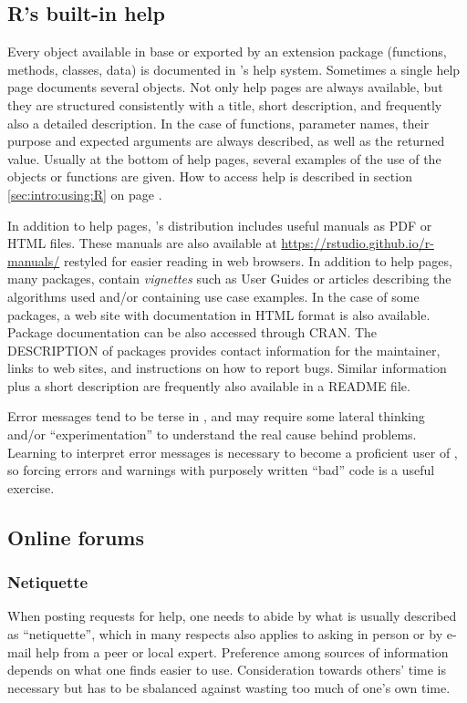\documentclass[krantz2]{krantz}\usepackage{knitr}
\begin{document}
\subsection{R's built-in help}

Every object available in base \Rlang or exported by an \Rlang extension package (functions, methods, classes, data) is documented in \Rlang's help system. Sometimes a single help page documents several \Rlang objects. Not only help pages are always available, but they are structured consistently with a title, short description, and frequently also a detailed description. In the case of functions, parameter names, their purpose and expected arguments are always described, as well as the returned value. Usually at the bottom of help pages, several examples of the use of the objects or functions are given. How to access \Rpgrm help is described in section \ref{sec:intro:using:R} on page \pageref{sec:intro:using:R}.

In addition to help pages, \Rpgrm's distribution includes useful manuals as PDF or HTML files. These manuals are also available at \url{https://rstudio.github.io/r-manuals/} restyled for easier reading in web browsers. In addition to help pages, many packages, contain \emph{vignettes} such as User Guides or articles describing the algorithms used and/or containing use case examples. In the case of some packages, a web site with documentation in HTML format is also available. Package documentation can be also accessed through CRAN. The DESCRIPTION of packages provides contact information for the maintainer, links to web sites, and instructions on how to report bugs. Similar information plus a short description are frequently also available in a README file.

Error messages tend to be terse in \Rpgrm, and may require some lateral thinking and/or ``experimentation'' to understand the real cause behind problems. Learning to interpret error messages is necessary to become a proficient user of \Rpgrm, so forcing errors and warnings with purposely written ``bad'' code is a useful exercise.

\subsection{Online forums}\label{sec:intro:net:help}

\subsubsection*{Netiquette}
When posting requests for help, one needs to abide by what is usually described as ``netiquette'', which in many respects also applies to asking in person or by e-mail help from a peer or local expert. Preference among sources of information depends on what one finds easier to use. Consideration towards others' time is necessary but has to be sbalanced against wasting too much of one's own time.
\end{document}
